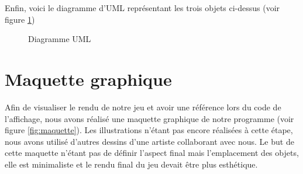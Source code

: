 \documentclass[12pt]{report}
\begin{document}
	Enfin, voici le diagramme d'UML représentant les trois objets ci-dessus (voir figure \ref{fig:UML})

	\begin{figure}
		\caption{Diagramme UML}
		\label{fig:UML}
	\end{figure}

  \section{Maquette graphique}
  Afin de visualiser le rendu de notre jeu et avoir une référence lors du code de l'affichage, nous avons réalisé une maquette graphique de notre programme (voir figure \ref{fig:maquette}). Les illustrations n'étant pas encore réalisées à cette étape, nous avons utilisé d'autres dessins d'une artiste collaborant avec nous. Le but de cette maquette n'étant pas de définir l'aspect final mais l'emplacement des objets, elle est minimaliste et le rendu final du jeu devait être plus esthétique.
\end{document}
